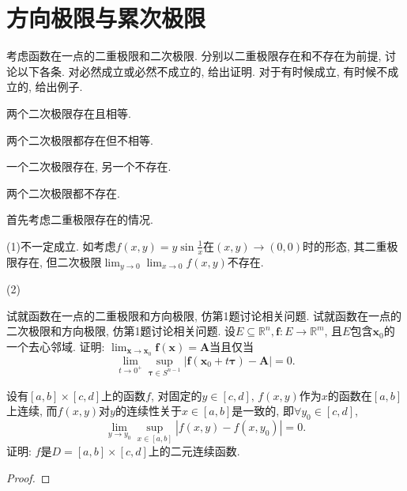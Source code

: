 \section{方向极限与累次极限}
\begin{quiza}
\woe 考虑函数在一点的二重极限和二次极限. 分别以二重极限存在和不存在为前提, 讨论以下各条. 对必然成立或必然不成立的, 给出证明. 对于有时候成立, 有时候不成立的, 给出例子.
\begin{quizcs}
\item 两个二次极限存在且相等.
\item 两个二次极限都存在但不相等.
\item 一个二次极限存在, 另一个不存在.
\item 两个二次极限都不存在.
\end{quizcs}
\begin{solution}
首先考虑二重极限存在的情况.

(1)不一定成立. 如考虑\(f(x,y)=y\sin\frac{1}{x}\)在\((x,y)\rightarrow(0,0)\)时的形态, 其二重极限存在, 但二次极限\(\lim_{y\rightarrow 0}\lim_{x\rightarrow 0}f(x,y)\)不存在.

(2)
\end{solution}
\woe 试就函数在一点的二重极限和方向极限, 仿第1题讨论相关问题.
\woe 试就函数在一点的二次极限和方向极限, 仿第1题讨论相关问题.
\woe 设\(E\subseteq\mathbb{R}^n,\boldsymbol{f}:E\rightarrow\mathbb{R}^m\), 且\(E\)包含\(\boldsymbol{x}_0\)的一个去心邻域. 证明: \(\lim_{\boldsymbol{x}\rightarrow\boldsymbol{x}_0}\boldsymbol{f}(\boldsymbol{x})=\boldsymbol{A}\)当且仅当\[\lim_{t\rightarrow0^+}\sup_{\boldsymbol{\tau}\in S^{n-1}}\left|\boldsymbol{f}(\boldsymbol{x}_0+t\boldsymbol{\tau})-\boldsymbol{A}\right|=0.\]
\end{quiza}
\begin{quizb}
\woe 设有\([a,b]\times[c,d]\)上的函数\(f\), 对固定的\(y\in[c,d],\,f(x,y)\)作为\(x\)的函数在\([a,b]\)上连续, 而\(f(x,y)\)对\(y\)的连续性关于\(x\in [a,b]\)是一致的, 即\(\forall y_0\in[c,d]\),\[\lim_{y\rightarrow y_0}\sup_{x\in [a,b]}\left|f(x,y)-f(x,y_0)\right|=0.\]证明: \(f\)是\(D=[a,b]\times [c,d]\)上的二元连续函数.
\begin{proof}
	
\end{proof}
\end{quizb}